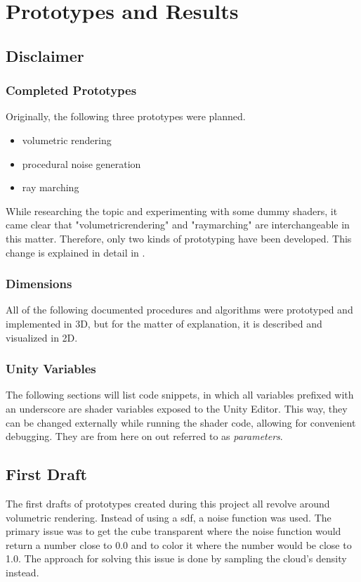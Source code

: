 \section{Prototypes and Results}

\subsection{Disclaimer}
\subsubsection{Completed Prototypes}
Originally, the following three prototypes were planned.
\begin{itemize}
    \item volumetric rendering
    \item procedural noise generation
    \item ray marching
\end{itemize}
While researching the topic and experimenting with some dummy shaders, it came clear that "\gls{volumetricrendering}" and "\gls{raymarching}" are interchangeable in this matter.
Therefore, only two kinds of prototyping have been developed. This change is explained in detail in .

\subsubsection{Dimensions}
All of the following documented procedures and algorithms were prototyped and implemented in 3D, but for the matter of explanation, it is described and visualized in 2D.

\subsubsection{Unity Variables}
The following sections will list code snippets, in which all variables prefixed with an underscore are shader variables exposed to the Unity Editor. This way, they can be changed externally while running the shader code, allowing for convenient debugging.
They are from here on out referred to as \textit{\gls{parameters}}.

\clearpage
\subsection{First Draft}
The first drafts of prototypes created during this project all revolve around volumetric rendering. 
Instead of using a \gls{sdf}, a noise function was used. The primary issue was to get the cube transparent where the noise function would return a number close to 0.0 and to color it where the number would be close to 1.0.
The approach for solving this issue is done by sampling the cloud's density instead.

